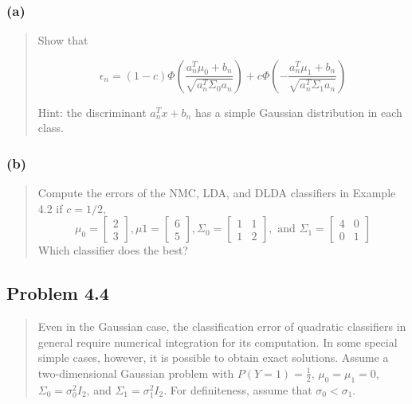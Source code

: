 \documentclass[
  letterpaper,
  DIV=11,
  numbers=noendperiod]{scrartcl}
\begin{document}
\hypertarget{a}{%
\subsubsection{(a)}\label{a}}

\begin{quote}
Show that

\[\epsilon_n = (1-c)\Phi\left( \frac{a_{n}^{T}\mu_0 + b_n}{\sqrt{a_{n}^{T}\Sigma_0 a_n}} \right) + c \Phi\left( -\frac{a^{T}_{n}\mu_1 + b_n}{\sqrt{a_{n}^{T}\Sigma_1 a_n}}\right)\]

Hint: the discriminant \(a^{T}_{n}x+b_n\) has a simple Gaussian
distribution in each class.
\end{quote}

\hypertarget{b}{%
\subsubsection{(b)}\label{b}}

\begin{quote}
Compute the errors of the NMC, LDA, and DLDA classifiers in Example 4.2
if \(c=1/2\), \begin{equation*}
\mu_0 =
\begin{bmatrix}
2\\ 
3
\end{bmatrix},
\mu1 =
\begin{bmatrix}
6\\ 
5
\end{bmatrix},
\Sigma_0 = 
\begin{bmatrix}
1 & 1\\ 
1 & 2
\end{bmatrix},
\text{ and } 
\Sigma_1 = 
\begin{bmatrix}
4 & 0\\
0 & 1
\end{bmatrix}
\end{equation*} Which classifier does the best?
\end{quote}

\hypertarget{problem-4.4}{%
\subsection{Problem 4.4}\label{problem-4.4}}

\begin{quote}
Even in the Gaussian case, the classification error of quadratic
classifiers in general require numerical integration for its
computation. In some special simple cases, however, it is possible to
obtain exact solutions. Assume a two-dimensional Gaussian problem with
\(P(Y=1)=\frac{1}{2}\), \(\mu_0=\mu_1 = 0\),
\(\Sigma_0=\sigma_{0}^{2}I_2\), and \(\Sigma_1 = \sigma^{2}_{1}I_2\).
For definiteness, assume that \(\sigma_0 < \sigma_1\).
\end{quote}
\end{document}
